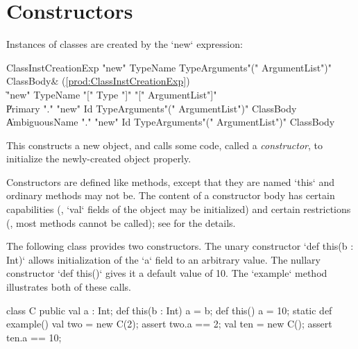 \section{Constructors}
\label{sect:constructors}

Instances of classes are created by the \xcd`new` expression: \\
\begin{bbgrammar}
ClassInstCreationExp \: \xcd"new" TypeName TypeArguments\opt \xcd"(" ArgumentList\opt \xcd")" ClassBody\opt & (\ref{prod:ClassInstCreationExp}) \\
                    \| \xcd"new" TypeName \xcd"[" Type \xcd"]" \xcd"[" ArgumentList\opt \xcd"]" \\
                    \| Primary \xcd"." \xcd"new" Id TypeArguments\opt \xcd"(" ArgumentList\opt \xcd")" ClassBody\opt \\
                    \| AmbiguousName \xcd"." \xcd"new" Id TypeArguments\opt \xcd"(" ArgumentList\opt \xcd")" ClassBody\opt \\
\end{bbgrammar}

This constructs a new object, and calls some code, called a {\em constructor},
to initialize the newly-created object properly.

Constructors are defined like methods, except that they are named \xcd`this`
and ordinary methods may not be.    The content of a constructor body has
certain capabilities (\eg, \xcd`val` fields of the object may be initialized)
and certain restrictions (\eg, most methods cannot be called); see
 for the details.

\begin{ex}

The following class provides two constructors.  The unary constructor 
\xcd`def this(b : Int)` allows initialization of the \xcd`a` field to an 
arbitrary value.  The nullary constructor \xcd`def this()` gives it a default
value of 10.  The \xcd`example` method illustrates both of these calls.


\begin{xten}
class C {
  public val a : Int;
  def this(b : Int) { a = b; } 
  def this()        { a = 10; }
  static def example() {
     val two = new C(2);
     assert two.a == 2;
     val ten = new C(); 
     assert ten.a == 10;
  }
}
\end{xten}
%
\end{ex}

